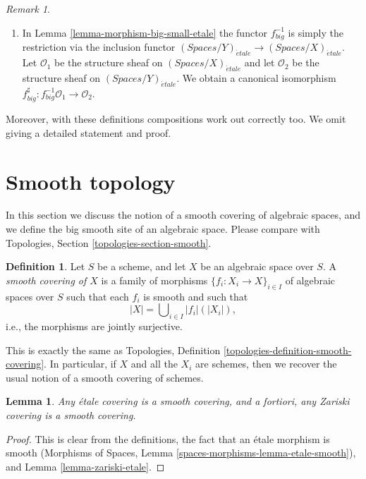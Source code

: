 \documentclass{stacks-project}
\theoremstyle{plain}
\newtheorem{lemma}[subsection]{Lemma}
\theoremstyle{definition}
\newtheorem{definition}[subsection]{Definition}
\theoremstyle{remark}
\newtheorem{remark}[subsection]{Remark}
\numberwithin{equation}{subsection}
\def\etale{{\acute{e}tale}}
\begin{document}
\begin{remark}
\begin{enumerate}
was discussed in Properties of Spaces, Lemma
\ref{spaces-properties-lemma-morphism-ringed-topoi}.
\item In Lemma \ref{lemma-morphism-big-small-etale}
the functor $f_{big}^{-1}$ is simply the restriction
via the inclusion functor
$(\textit{Spaces}/Y)_\etale \to (\textit{Spaces}/X)_\etale$.
Let $\mathcal{O}_1$ be the structure sheaf on $(\textit{Spaces}/X)_\etale$
and let $\mathcal{O}_2$ be the structure sheaf on $(\textit{Spaces}/Y)_\etale$.
We obtain a canonical isomorphism
$f_{big}^\sharp : f_{big}^{-1}\mathcal{O}_1 \to \mathcal{O}_2$.
\end{enumerate}
Moreover, with these definitions compositions work out correctly too.
We omit giving a detailed statement and proof.
\end{remark}









\section{Smooth topology}
\label{section-smooth}

\noindent
In this section we discuss the notion of a smooth covering of
algebraic spaces, and we define the big smooth site of an
algebraic space. Please compare with
Topologies, Section \ref{topologies-section-smooth}.

\begin{definition}
\label{definition-smooth-covering}
Let $S$ be a scheme, and let $X$ be an algebraic space over $S$.
A {\it smooth covering of $X$} is a family of morphisms
$\{f_i : X_i \to X\}_{i \in I}$ of algebraic spaces over $S$
such that each $f_i$ is smooth
and such that
$$
|X| = \bigcup\nolimits_{i \in I} |f_i|(|X_i|),
$$
i.e., the morphisms are jointly surjective.
\end{definition}

\noindent
This is exactly the same as
Topologies, Definition \ref{topologies-definition-smooth-covering}.
In particular, if $X$ and all the $X_i$ are schemes, then we recover the
usual notion of a smooth covering of schemes.

\begin{lemma}
\label{lemma-zariski-etale-smooth}
Any \'etale covering is a smooth covering, and a fortiori,
any Zariski covering is a smooth covering.
\end{lemma}

\begin{proof}
This is clear from the definitions, the fact that an
\'etale morphism is smooth
(Morphisms of Spaces, Lemma \ref{spaces-morphisms-lemma-etale-smooth}), and
Lemma \ref{lemma-zariski-etale}.
\end{proof}
\end{document}
